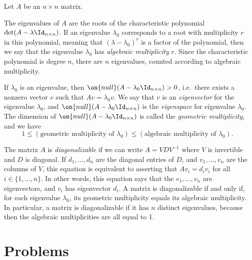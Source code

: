 \documentclass[10pt]{amsart}
\theoremstyle{mythm}
\theoremstyle{definition}
\theoremstyle{myrmk}
\newcounter{part-count}
\begin{document}
	\thispagestyle{fancy}
	
	Let $A$ be an $n \times n$ matrix. 
	
	The eigenvalues of $A$ are the roots of the characteristic polynomial $\det(A - \lambda \Id_{n \times n})$. If an eigenvalue $\lambda_0$ corresponds to a root with multiplicity $r$ in this polynomial, meaning that $(\lambda-\lambda_0)^r$ is a factor of the polynomial, then we say that the eigenvalue $\lambda_0$ has \emph{algebraic multiplicity} $r$. Since the characteristic polynomial is degree $n$, there are $n$ eigenvalues, counted according to algebraic multiplicity. 
	
	If $\lambda_0$ is an eigenvalue, then $\on{null}(A - \lambda_0 \Id_{n \times n})> 0$, i.e.\ there exists a nonzero vector $v$ such that $Av = \lambda_0 v$. We say that $v$ is an \emph{eigenvector} for the eigenvalue $\lambda_0$, and $\on{null}(A - \lambda_0 \Id_{n \times n})$ is the \emph{eigenspace} for eigenvalue $\lambda_0$. The dimension of $\on{null}(A - \lambda_0 \Id_{n \times n})$ is called the \emph{geometric multiplicity}, and we have 
	\[
		1 \le (\text{geometric multiplicity of } \lambda_0) \le (\text{algebraic multiplicity of } \lambda_0). 
	\]
	
	The matrix $A$ is \emph{diagonalizable} if we can write $A = VD V^{-1}$ where $V$ is invertible and $D$ is diagonal. If $d_1, \ldots, d_n$ are the diagonal entries of $D$, and $v_1, \ldots, v_n$ are the columns of $V$, this equation is equivalent to asserting that $Av_i = d_i v_i $ for all $i \in \{1, \ldots, n\}$. In other words, this equation says that the $v_1, \ldots, v_n$ are eigenvectors, and $v_i$ has eigenvector $d_i$. A matrix is diagonalizable if and only if, for each eigenvalue $\lambda_0$, its geometric multiplicity equals its algebraic multiplicity. In particular, a matrix is diagonalizable if it has $n$ distinct eigenvalues, because then the algebraic multiplicities are all equal to 1. 
	
	\section*{Problems}
	
\end{document}
